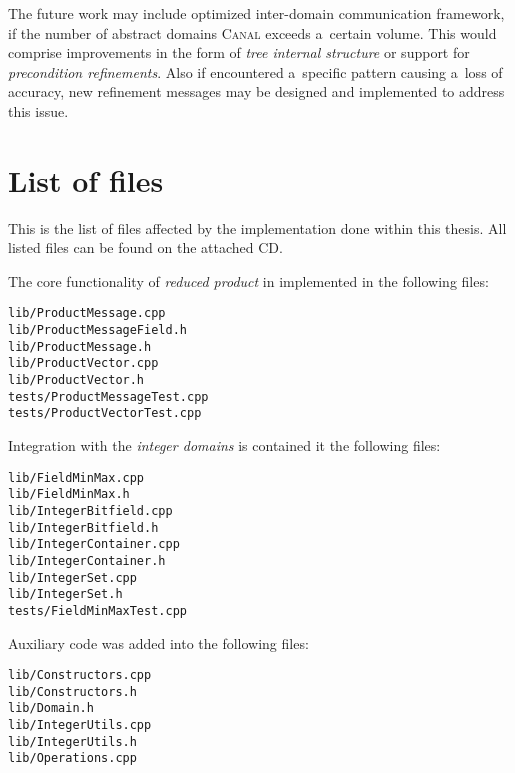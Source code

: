 \documentclass[12pt,oneside]{fithesis2}
\theoremstyle{definition}
\begin{document}
The future work may include optimized inter-domain communication framework, if the number of abstract domains \textsc{Canal} exceeds a~certain volume. This would comprise improvements in the form of \textit{tree internal structure} or support for \textit{precondition refinements}. Also if encountered a~specific pattern causing a~loss of accuracy, new refinement messages may be designed and implemented to address this issue.




\appendix
\chapter{List of files}

This is the list of files affected by the implementation done within this thesis. All listed files can be found on the attached CD.

The core functionality of \textit{reduced product} in implemented in the following files:

\begin{verbatim}
lib/ProductMessage.cpp
lib/ProductMessageField.h
lib/ProductMessage.h
lib/ProductVector.cpp
lib/ProductVector.h
tests/ProductMessageTest.cpp
tests/ProductVectorTest.cpp
\end{verbatim}

Integration with the \textit{integer domains} is contained it the following  files:

\begin{verbatim}
lib/FieldMinMax.cpp
lib/FieldMinMax.h
lib/IntegerBitfield.cpp
lib/IntegerBitfield.h
lib/IntegerContainer.cpp
lib/IntegerContainer.h
lib/IntegerSet.cpp
lib/IntegerSet.h
tests/FieldMinMaxTest.cpp
\end{verbatim}

Auxiliary code was added into the following files:

\begin{verbatim}
lib/Constructors.cpp
lib/Constructors.h
lib/Domain.h
lib/IntegerUtils.cpp
lib/IntegerUtils.h
lib/Operations.cpp
\end{verbatim}
\end{document}
